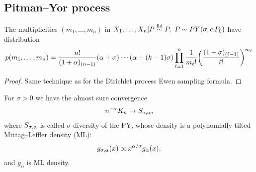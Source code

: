 
\subsection{Pitman--Yor process}
	\begin{proposition}
 The multiplicities $(m_1,\ldots,m_n)$ in $X_1,\ldots, X_n|P\stackrel{\mbox{\scriptsize{iid}}}{\sim} P,\ P\sim PY(\sigma, \alpha P_0)$ have distribution
\begin{equation*}
    p(m_1,\ldots,m_n)=\frac{n!}{(1+\alpha)_{(n-1)}}(\alpha +\sigma)\cdots (\alpha+(k-1)\sigma)\prod_{\ell=1}^n\frac{1}{m_\ell!}\bigg(\frac{(1-\sigma)_{(\ell-1)} }{\ell!}\bigg)^{m_\ell}
\end{equation*}
\end{proposition}


\begin{proof}
Same technique as for the Dirichlet process Ewen sampling formula.
\end{proof}




\begin{proposition}
For $\sigma >0$ we have the almost sure convergence 
$$
n^{-\sigma}K_n\rightarrow S_{\sigma, \alpha},
$$
where $ S_{\sigma, \alpha}$ is called $\sigma$-diversity of the PY, whose density is a polynomially tilted \alert{Mittag--Leffler density} (ML):
\begin{equation*}
    g_{\sigma,\alpha}(x)\propto x^{\alpha/\sigma}g_\alpha (x),
\end{equation*}
and $g_\alpha$ is ML density.
\end{proposition}

